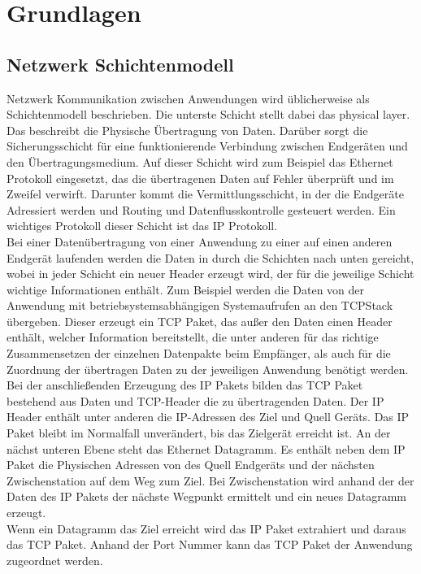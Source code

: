 \chapter{Grundlagen}

\section{Netzwerk Schichtenmodell}
Netzwerk Kommunikation zwischen Anwendungen wird üblicherweise als Schichtenmodell beschrieben.  
Die unterste Schicht stellt dabei das physical layer. Das beschreibt die Physische Übertragung von Daten. 
Darüber sorgt die Sicherungsschicht für eine funktionierende Verbindung zwischen Endgeräten und den Übertragungsmedium. Auf dieser Schicht wird zum Beispiel das Ethernet Protokoll eingesetzt, das die übertragenen Daten auf Fehler überprüft und im Zweifel verwirft. 
Darunter kommt die Vermittlungsschicht, in der die Endgeräte Adressiert werden und Routing und Datenflusskontrolle gesteuert werden. Ein wichtiges Protokoll dieser Schicht ist das IP Protokoll. \\
Bei einer Datenübertragung von einer Anwendung zu einer auf einen anderen Endgerät laufenden werden die Daten in durch die Schichten nach unten gereicht, wobei in jeder Schicht ein neuer Header erzeugt wird, der für die jeweilige Schicht wichtige Informationen enthält. Zum Beispiel werden die Daten von der Anwendung mit betriebsystemsabhängigen Systemaufrufen an den TCPStack übergeben. Dieser erzeugt ein TCP Paket, das außer den Daten einen Header enthält, welcher Information bereitstellt, die unter anderen für das richtige Zusammensetzen der einzelnen Datenpakte beim Empfänger, als auch für die Zuordnung der übertragen Daten zu der jeweiligen Anwendung benötigt werden. Bei der anschließenden Erzeugung des IP Pakets bilden das TCP Paket bestehend aus Daten und TCP-Header die zu übertragenden Daten. Der IP Header enthält unter anderen die IP-Adressen des Ziel und Quell Geräts. Das IP Paket bleibt im Normalfall unverändert, bis das Zielgerät erreicht ist. An der nächst unteren Ebene steht das Ethernet Datagramm. Es enthält neben dem IP Paket die Physischen Adressen von des Quell Endgeräts und der nächsten Zwischenstation auf dem Weg zum Ziel. Bei Zwischenstation wird anhand der der Daten des IP Pakets der nächste Wegpunkt ermittelt und ein neues Datagramm erzeugt. \\
Wenn ein Datagramm das Ziel erreicht wird das IP Paket extrahiert und daraus das TCP Paket. Anhand der Port Nummer kann das TCP Paket der Anwendung zugeordnet werden.



